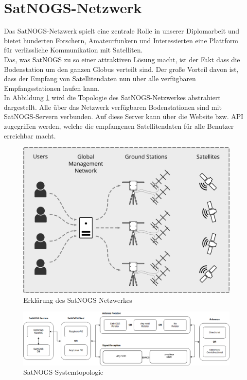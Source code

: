 \section{SatNOGS-Netzwerk}
\label{sec:sat}
Das SatNOGS-Netzwerk spielt eine zentrale Rolle in unserer Diplomarbeit und bietet hunderten Forschern, Amateurfunkern und Interessierten eine Plattform für verlässliche Kommunikation mit Satelliten.\\
\newline
Das, was SatNOGS zu so einer attraktiven Lösung macht, ist der Fakt dass die Bodenstation um den ganzen Globus verteilt sind. Der große Vorteil davon ist, dass der Empfang von Satellitendaten nun über alle verfügbaren Empfangsstationen laufen kann.\\
\newline
In Abbildung \ref{fig:SatNOGS_Erklärung} wird die Topologie des SatNOGS-Netzwerkes abstrahiert dargestellt.
Alle über das Netzwerk verfügbaren Bodenstationen sind mit SatNOGS-Servern verbunden. Auf diese Server kann über die Website bzw. API zugegriffen werden, welche die empfangenen Satellitendaten für alle Benutzer erreichbar macht.

\begin{figure}[H]
	\centering
	\includegraphics[width=\textwidth]{../ref/SatNOGS_explanation}
	\caption{Erklärung des SatNOGS Netzwerkes}
	\label{fig:SatNOGS_Erklärung}
\end{figure}	

\begin{figure}[H]
	\centering
	\includegraphics[width=\textwidth]{../ref/SatNOGS_BlockDiagram}
	\caption{SatNOGS-Systemtopologie}
	\label{fig:SatNOGS_Systemtopologie}
\end{figure}

